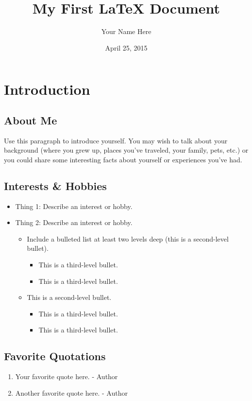 \documentclass{article}
\title{My First \LaTeX{} Document}
\author{Your Name Here}
\date{April 25, 2015}
\begin{document}
\maketitle

\section{Introduction}

\subsection{About Me}
Use this paragraph to introduce yourself. You may wish to talk about your background (where you grew up, places you’ve traveled, your family, pets, etc.) or you could share some interesting facts about yourself or experiences you’ve had.

\subsection{Interests \& Hobbies}
\begin{itemize}
    \item Thing 1: Describe an interest or hobby.
    \item Thing 2: Describe an interest or hobby.
    \begin{itemize}
        \item Include a bulleted list at least two levels deep (this is a second-level bullet).
        \begin{itemize}
            \item This is a third-level bullet.
            \item This is a third-level bullet.
        \end{itemize}
        \item This is a second-level bullet.
        \begin{itemize}
            \item This is a third-level bullet.
            \item This is a third-level bullet.
        \end{itemize}
    \end{itemize}
\end{itemize}

\subsection{Favorite Quotations}
\begin{enumerate}
    \item Your favorite quote here. - Author
    \item Another favorite quote here. - Author
\end{enumerate}
\end{document}
